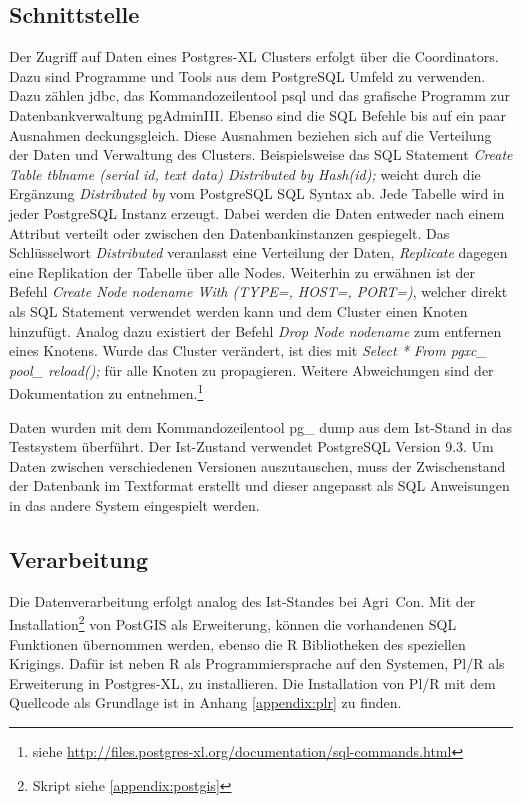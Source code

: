 \subsection{Schnittstelle}
Der Zugriff auf Daten eines Postgres-XL Clusters erfolgt über die Coordinators.
Dazu sind Programme und Tools aus dem PostgreSQL Umfeld zu verwenden.
Dazu zählen \Gls{jdbc}, das Kommandozeilentool psql und das grafische Programm zur Datenbankverwaltung pgAdminIII.
Ebenso sind die SQL Befehle bis auf ein paar Ausnahmen deckungsgleich.
Diese Ausnahmen beziehen sich auf die Verteilung der Daten und Verwaltung des Clusters.
Beispielsweise das SQL Statement \textit{Create Table tblname (serial id, text data) Distributed by Hash(id);} weicht durch die Ergänzung \textit{Distributed by} vom PostgreSQL SQL Syntax ab.
Jede Tabelle wird in jeder PostgreSQL Instanz erzeugt.
Dabei werden die Daten entweder nach einem Attribut verteilt oder zwischen den Datenbankinstanzen gespiegelt.
Das Schlüsselwort \textit{Distributed} veranlasst eine Verteilung der Daten, \textit{Replicate} dagegen eine Replikation der Tabelle über alle Nodes.
Weiterhin zu erwähnen ist der Befehl \textit{Create Node nodename With (TYPE=, HOST=, PORT=)}, welcher direkt als SQL Statement verwendet werden kann und dem Cluster einen Knoten hinzufügt.
Analog dazu existiert der Befehl \textit{Drop Node nodename} zum entfernen eines Knotens.
Wurde das Cluster verändert, ist dies mit \textit{Select * From pgxc\_ pool\_ reload();} für alle Knoten zu propagieren.
Weitere Abweichungen sind der Dokumentation zu entnehmen.\footnote{siehe \url{http://files.postgres-xl.org/documentation/sql-commands.html}}

Daten wurden mit dem Kommandozeilentool pg\_ dump aus dem Ist-Stand in das Testsystem überführt.
Der Ist-Zustand verwendet PostgreSQL Version 9.3.
Um Daten zwischen verschiedenen Versionen auszutauschen, muss der Zwischenstand der Datenbank im Textformat erstellt und dieser angepasst als SQL Anweisungen in das andere System eingespielt werden.



\subsection{Verarbeitung}
Die Datenverarbeitung erfolgt analog des Ist-Standes bei Agri~Con.
Mit der Installation\footnote{Skript siehe \ref{appendix:postgis}} von PostGIS als Erweiterung, können die vorhandenen SQL Funktionen übernommen werden, ebenso die R Bibliotheken des speziellen Krigings.
Dafür ist neben R als Programmiersprache auf den Systemen, Pl/R als Erweiterung in Postgres-XL, zu installieren.
Die Installation von Pl/R mit dem Quellcode als Grundlage ist in Anhang \ref{appendix:plr} zu finden.

